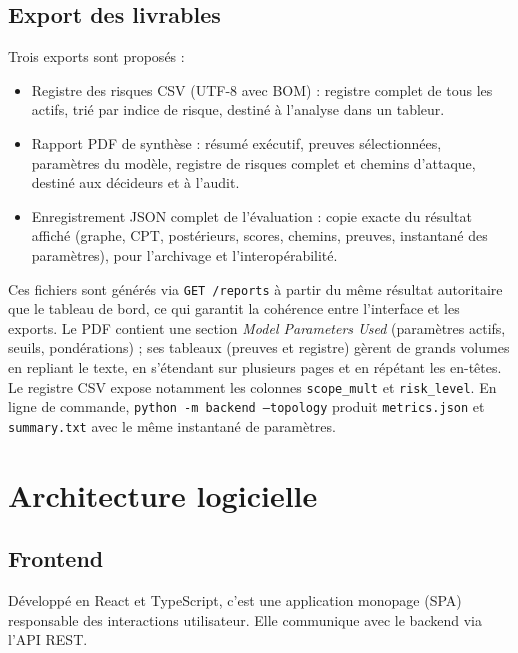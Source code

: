\documentclass[12pt,a4paper]{article}
\newcommand{\forcereset}[1]{}
\begin{document}
\subsection{Export des livrables}
\forcereset{4}

Trois exports sont proposés :

\begin{itemize}[leftmargin=1.2cm, itemsep=0.2\baselineskip]
    \item Registre des risques CSV (UTF-8 avec BOM) : registre complet de tous les actifs, trié par indice de risque, destiné à l'analyse dans un tableur.
    \item Rapport PDF de synthèse : résumé exécutif, preuves sélectionnées, paramètres du modèle, registre de risques complet et chemins d'attaque, destiné aux décideurs et à l'audit.
    \item Enregistrement JSON complet de l'évaluation : copie exacte du résultat affiché (graphe, CPT, postérieurs, scores, chemins, preuves, instantané des paramètres), pour l'archivage et l'interopérabilité.
\end{itemize}

Ces fichiers sont générés via \texttt{GET /reports} à partir du même résultat autoritaire que le tableau de bord, ce qui garantit la cohérence entre l'interface et les exports. Le PDF contient une section \emph{Model Parameters Used} (paramètres actifs, seuils, pondérations) ; ses tableaux (preuves et registre) gèrent de grands volumes en repliant le texte, en s'étendant sur plusieurs pages et en répétant les en-têtes. Le registre CSV expose notamment les colonnes \texttt{scope\_mult} et \texttt{risk\_level}. En ligne de commande, \texttt{python -m backend --topology} produit \texttt{metrics.json} et \texttt{summary.txt} avec le même instantané de paramètres.

\section{Architecture logicielle}
\forcereset{6}

\subsection{Frontend}
\forcereset{4}

Développé en React et TypeScript, c'est une application monopage (SPA) responsable des interactions utilisateur. Elle communique avec le backend via l'API REST.
\end{document}
